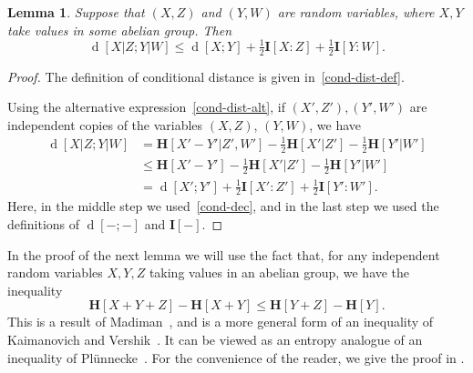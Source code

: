\documentclass[12pt,reqno,tbtags]{amsart}
\newtheorem{lemma}[theorem]{Lemma}
\theoremstyle{definition}
\theoremstyle{remark}
\renewcommand{\leq}{\leqslant}
\renewcommand{\le}{\leq}
\newcommand{\ent}[1]{\mathbf{H}[#1]}
\newcommand{\I}[1]{\mathbf{I}[#1]}
\newcommand{\dist}[2]{{\operatorname{d}[#1;#2]}} %
\numberwithin{equation}{section}
\begin{document}
\begin{lemma}%
  \label{cond-dist-fact}
  Suppose that $(X, Z)$ and $(Y, W)$ are random variables, where $X, Y$ take values in some abelian group. Then
  \[    \dist{X  | Z}{Y | W} \leq \dist{X}{Y} + \tfrac{1}{2} \I{X : Z} + \tfrac{1}{2} \I{Y : W}.\]
\end{lemma}
\begin{proof}
The definition of conditional distance is given in~\eqref{cond-dist-def}.

Using the alternative expression~\eqref{cond-dist-alt}, if $(X',Z'), (Y',W')$ are independent copies of the variables $(X,Z)$, $(Y,W)$, we have
\begin{align*}
  \dist{X  | Z}{Y | W} &= \ent{X'-Y'|Z',W'} - \tfrac{1}{2} \ent{X'|Z'} - \tfrac{1}{2}\ent{Y'|W'} \\
                       &\le \ent{X'-Y'}- \tfrac{1}{2} \ent{X'|Z'} - \tfrac{1}{2}\ent{Y'|W'} \\
                       &= \dist{X'}{Y'} + \tfrac{1}{2} \I{X' : Z'} + \tfrac{1}{2} \I{Y' : W'}.
\end{align*}
Here, in the middle step we used~\eqref{cond-dec}, and in the last step we used the definitions of $\dist{-}{-}$ and $\I{-}$.
\end{proof}

In the proof of the next lemma we will use the fact that, for any independent random variables $X, Y, Z$ taking values in an abelian group, we have the inequality
\begin{equation}\label{kv-2}
  \ent{X + Y + Z} - \ent{X + Y} \leq \ent{Y+Z} - \ent{Y}.
\end{equation}
This is a result of Madiman~\cite[Theorem I]{madiman}, and is a more general form of an inequality of Kaimanovich and Vershik~\cite[Proposition 1.3]{kv}. It can be viewed as an entropy analogue of an inequality of Pl\"unnecke~\cite{plunnecke}. For the convenience of the reader, we give the proof in .
\end{document}
